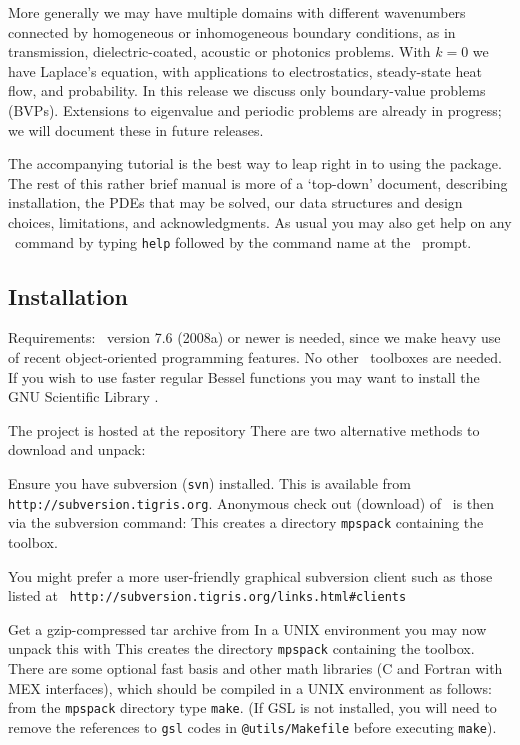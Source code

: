 \documentclass[12pt]{article}
\begin{document}
More generally we may have multiple domains with different
wavenumbers connected by homogeneous or inhomogeneous boundary conditions,
as in transmission, dielectric-coated, acoustic or photonics problems.
With $k=0$ we have Laplace's equation, with applications to
electrostatics, steady-state heat flow, and probability.
In this release we discuss only boundary-value problems (BVPs).
Extensions to eigenvalue and periodic problems are already in progress;
we will document these in future releases.

The accompanying tutorial is the best way to leap right in to using
the package.
The rest of this rather brief manual is more of a `top-down' document,
describing installation, the PDEs that may be solved,
our data structures and design choices, limitations, and acknowledgments.
As usual you
may also get help on any \mpspack\ command by typing {\tt help} followed
by the command name at the \matlab\ prompt.


\subsection{Installation}

Requirements: \matlab\ version 7.6 (2008a) or newer is needed,
since we make heavy use of recent object-oriented programming features.
No other \matlab\ toolboxes are needed.
If you wish to use faster regular Bessel functions you may want to
install the GNU Scientific Library \cite{GSL}.

The project is hosted at the repository
There are two alternative methods to download and unpack:
\ben
\item
Ensure you have subversion ({\tt svn}) installed.
This is available from {\tt http://subversion.tigris.org}.
Anonymous check out (download) of \mpspack\ is then via the subversion
command:
This creates a directory {\tt mpspack} containing the toolbox.

You might prefer a more user-friendly graphical
subversion client such as those listed at {\tt
http://subversion.tigris.org/links.html\#clients}

\item
Get a gzip-compressed tar archive from
In a UNIX environment you may now
unpack this with
This creates the directory {\tt mpspack} containing the toolbox.
\een
There are some optional fast basis and other math libraries
(C and Fortran with MEX interfaces), which should be compiled
in a UNIX environment as follows:
from the {\tt mpspack} directory type {\tt make}.
(If GSL \cite{GSL} is not installed, you will need to remove the
references to {\tt gsl} codes in {\tt @utils/Makefile} before
executing {\tt make}).
\end{document}
